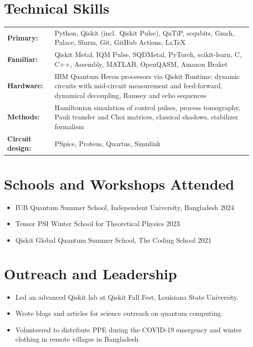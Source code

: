 \documentclass[letterpaper,11pt]{article}
\newenvironment{cvblock}
  {\par\noindent\begin{minipage}[t]{\textwidth}\raggedright}
  {\end{minipage}\par\vspace{5pt}}
\begin{document}
\section{Technical Skills}
\begin{cvblock}
\begin{tabularx}{\textwidth}{@{}l X@{}}
  \textbf{Primary:}             & Python, Qiskit (incl.\ Qiskit Pulse), QuTiP, scqubits, Gmsh, Palace, Slurm, Git, GitHub Actions, \LaTeX \\
  \textbf{Familiar:}            & Qiskit Metal, IQM Pulse, SQDMetal, PyTorch, scikit-learn, C, C++, Assembly, MATLAB, OpenQASM, Amazon Braket \\
  \textbf{Hardware:}            & IBM Quantum Heron processors via Qiskit Runtime: dynamic circuits with mid-circuit measurement and feed-forward, dynamical decoupling, Ramsey and echo sequences \\
  \textbf{Methods:}             & Hamiltonian simulation of control pulses, process tomography, Pauli transfer and Choi matrices, classical shadows, stabilizer formalism \\
  \textbf{Circuit design:}      & PSpice, Proteus, Quartus, Simulink \\
\end{tabularx}

\end{cvblock}

\section{Schools and Workshops Attended}
\begin{cvblock}
\begin{itemize}
  \item IUB Quantum Summer School, Independent University, Bangladesh \hfill 2024
  \item Tensor PSI Winter School for Theoretical Physics \hfill 2023
  \item Qiskit Global Quantum Summer School, The Coding School \hfill 2021
\end{itemize}
\end{cvblock}

\section{Outreach and Leadership}
\begin{cvblock}
\begin{itemize}
  \item Led an advanced Qiskit lab at Qiskit Fall Fest, Louisiana State University.
  \item Wrote blogs and articles for science outreach on quantum computing.
  \item Volunteered to distribute PPE during the COVID-19 emergency and winter clothing in remote villages in Bangladesh.
\end{itemize}
\end{cvblock}
\end{document}
